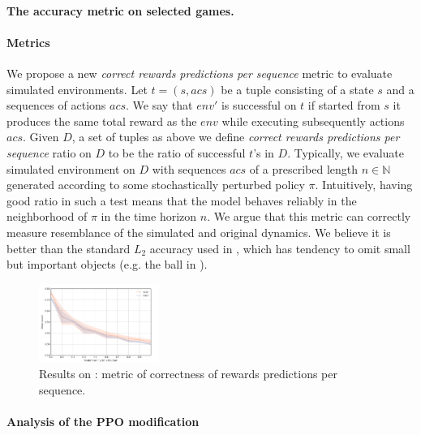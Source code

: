 \paragraph{The accuracy metric on selected games.}

\paragraph{Metrics}
We propose a new \textit{correct rewards predictions per sequence} metric to evaluate simulated environments. 
Let $t = (s, acs)$ be a tuple consisting of a state $s$ and a sequences of actions $acs$. We say that $env'$ is successful on $t$ if started from $s$ it produces the same total reward as the $env$ while executing subsequently actions $acs$.
Given $D$, a set of tuples as above we define \textit{correct rewards predictions per sequence} ratio on $D$ to be the ratio of successful $t$'s in $D$.
Typically, we evaluate simulated environment on $D$ with sequences $acs$ of a prescribed length $n\in \mathbb{N}$ generated according to some stochastically perturbed policy $\pi$. Intuitively, having good ratio in such a test means that the model behaves reliably in the neighborhood of $\pi$ in the time horizon $n$. %
We argue that this metric can correctly measure resemblance  of the simulated and original dynamics.  We believe it is better than the standard $L_2$ accuracy used in \cite{video_prediction,recurrent}, which has tendency to omit small but important objects (e.g. the ball in \pong).

\begin{figure}[H]
\includegraphics[width=0.35\textwidth]{figures/pong_ratio}%

\caption{Results on \pong: metric of correctness of rewards predictions per sequence.}
\label{fig:correctness}
\end{figure}

\paragraph{Analysis of the PPO modification}

